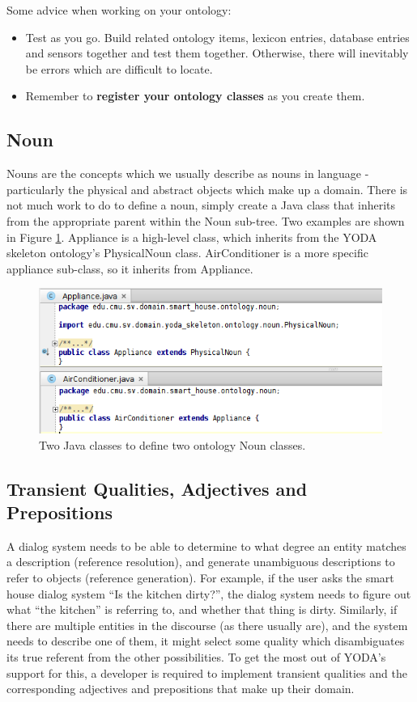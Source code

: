 \documentclass[titlepage]{article}
\begin{document}
Some advice when working on your ontology:
\begin{itemize}
\item Test as you go. 
Build related ontology items, lexicon entries, database entries and sensors together and test them together. 
Otherwise, there will inevitably be errors which are difficult to locate.
\item Remember to \textbf{register your ontology classes} as you create them.
\end{itemize}


\subsection{Noun}
Nouns are the concepts which we usually describe as nouns in language - particularly the physical and abstract objects which make up a domain.
There is not much work to do to define a noun, simply create a Java class that inherits from the appropriate parent within the Noun sub-tree.
Two examples are shown in Figure \ref{fig:nouns}.
Appliance is a high-level class, which inherits from the YODA skeleton ontology's PhysicalNoun class.
AirConditioner is a more specific appliance sub-class, so it inherits from Appliance.

\begin{figure}[!]
\centering
\includegraphics[width=.75\textwidth]{Nouns}
\caption{Two Java classes to define two ontology Noun classes.}
\label{fig:nouns}
\end{figure}



\subsection{Transient Qualities, Adjectives and Prepositions}

A dialog system needs to be able to determine to what degree an entity matches a description (reference resolution), and generate unambiguous descriptions to refer to objects (reference generation).
For example, if the user asks the smart house dialog system ``Is the kitchen dirty?'', the dialog system needs to figure out what ``the kitchen'' is referring to, and whether that thing is dirty.
Similarly, if there are multiple entities in the discourse (as there usually are), and the system needs to describe one of them, it might select some quality which disambiguates its true referent from the other possibilities.
To get the most out of YODA's support for this, a developer is required to implement transient qualities and the corresponding adjectives and prepositions that make up their domain.\\
\end{document}
